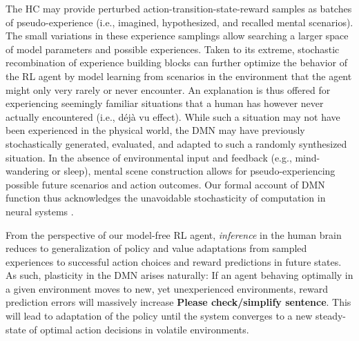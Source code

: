 \documentclass[10pt,letterpaper]{article}
\begin{document}
The HC may provide perturbed action-transition-state-reward samples
  as batches of pseudo-experience
  (i.e., imagined, hypothesized, and recalled mental scenarios).
  The small variations in these experience samplings allow searching
  a larger space of model parameters and possible experiences.
  Taken to its extreme, stochastic recombination of experience
  building blocks can further optimize the behavior of the RL agent
  by model learning from scenarios in the environment that the agent might
  only very rarely or never encounter.
  An explanation is thus offered for experiencing seemingly familiar situations that
  a human has however never actually encountered (i.e., d\'{e}j\`{a} vu effect).
  While such a situation may not have been experienced in the physical world,
  the DMN may have previously stochastically generated, evaluated, and adapted to
  such a randomly synthesized situation.
  In the absence of environmental input and feedback
  (e.g., mind-wandering or sleep),
  mental scene construction allows for pseudo-experiencing possible
  future scenarios and action outcomes.
  Our formal account of DMN function
  thus acknowledges the unavoidable stochasticity of
  computation in neural systems \citep{faisal2008noise}.


  From the perspective of our model-free RL agent,
  \textit{inference} in the human brain reduces to
  generalization of
  policy and value adaptations from sampled experiences to
  successful action choices and reward predictions in future states.
  As such,
  plasticity in the DMN arises naturally:
  If an agent behaving optimally in a given environment moves
  to new, yet unexperienced environments, reward prediction errors will
  massively increase \textbf{Please check/simplify sentence}.
  This will lead to adaptation of the policy until the system converges to a
  new steady-state of optimal action decisions in volatile environments.

\end{document}
